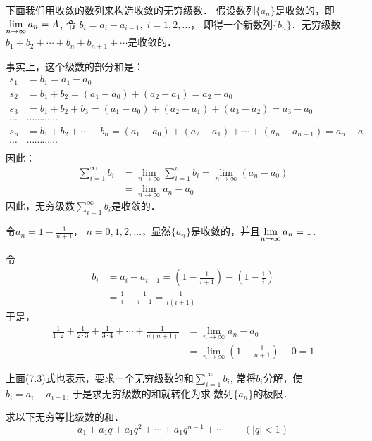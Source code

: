 下面我们用收敛的数列来构造收敛的无穷级数．
假设数列$\{a_n\}$是收敛的，即$\displaystyle\lim_{n\to\infty}a_n=A$, 令
$b_i=a_i-a_{i-1},\; i=1,2,\ldots$，
即得一个新数列$\{b_n\}$．无穷级数
$b_1+b_2+\cdots+b_n+b_{n+1}+\cdots$是收敛的．

事实上，这个级数的部分和是：
\[\begin{split}
    s_1&=b_1=a_1-a_0\\
    s_2&=b_1+b_2=(a_1-a_0)+(a_2-a_1)=a_2-a_0\\
    s_3&=b_1+b_2+b_3=(a_1-a_0)+(a_2-a_1)+(a_3-a_2)=a_3-a_0\\
    \cdots & \cdots\cdots\cdots\cdots\\
    s_n&=b_1+b_2+\cdots +b_n=(a_1-a_0)+(a_2-a_1)+\cdots +(a_n-a_{n-1})=a_n-a_0\\
    \cdots & \cdots\cdots\cdots\cdots\\
\end{split} \]
因此：
\begin{equation}
    \begin{split}
        \sum^{\infty}_{i=1}b_i&=\lim_{n\to\infty}\sum^n_{i=1}b_i=\lim_{n\to\infty}(a_n-a_0)\\
        &=\lim_{n\to\infty}a_n-a_0
    \end{split}
\end{equation}
因此，无穷级数$\sum^{\infty}_{i=1}b_i$是收敛的．


\begin{example}
令$a_n=1-\frac{1}{n+1}$， $n=0,1,2,\ldots$，显然$\{a_n\}$是收敛的，并且$\displaystyle\lim_{n\to \infty}a_n=1$．

令\[\begin{split}
    b_i&=a_{i}-a_{i-1}=\left(1-\frac{1}{i+1}\right)-\left(1-\frac{1}{i}\right)\\
    &=\frac{1}{i}-\frac{1}{i+1}=\frac{1}{i(i+1)}
\end{split}\]
于是，      
\[\begin{split}
    \frac{1}{1\cdot 2}+\frac{1}{2\cdot 3}+\frac{1}{3\cdot 4}+\cdots +\frac{1}{n(n+1)}&=\lim_{n\to\infty}a_n-a_0\\
    &=\lim_{n\to\infty}\left(1-\frac{1}{n+1}\right)-0=1
\end{split}\]

上面(7.3)式也表示，要求一个无穷级数的和$\sum^{\infty}_{i=1}b_i$, 常将$b_i$分解，使$b_i=a_i-a_{i-1}$, 于是求无穷级数的和就转化为求
数列$\{a_n\}$的极限．
\end{example}

\begin{example}
    求以下无穷等比级数的和．
    \[a_1+a_1q+a_1q^2+\cdots +a_1q^{n-1}+\cdots \qquad (|q|<1)\]
\end{example}


